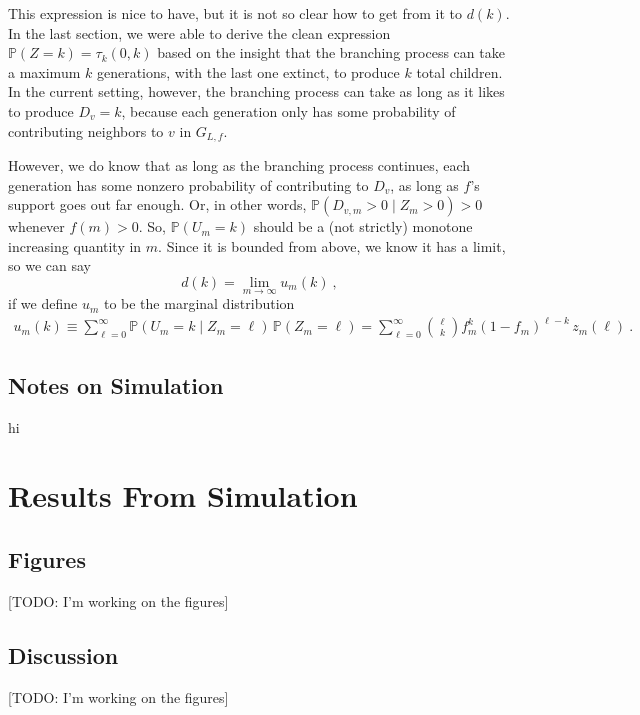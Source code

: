 \documentclass[12pt]{article}
\renewcommand{\P}{\mathbb{P}}
\begin{document}
This expression is nice to have, but it is not so clear how to get from it to $d(k)$.
In the last section, we were able to derive the clean expression $\P(Z=k)=\tau_k(0,k)$
based on the insight that the branching process can take a maximum $k$ generations, with the
last one extinct, to produce $k$ total children. In the current setting, however, the branching
process can take as long as it likes to produce $D_{v}=k$, because each generation only
has some probability of contributing neighbors to $v$ in $G_{L,f}$.\par

However, we do know that as long as the branching process continues, each generation has some
nonzero probability of contributing to $D_{v}$, as long as $f$'s support goes out far enough.
Or, in other words, $\P(D_{v,m} > 0 \mid Z_m > 0) > 0$ whenever $f(m) > 0$. So, $\P(U_m=k)$
should be a (not strictly) monotone increasing quantity in $m$. Since it is bounded from above,
we know it has a limit, so we can say \[ d(k) = \lim_{m\to\infty} u_m(k)\ ,\] if we define
$u_m$ to be the marginal distribution
\begin{align*}
u_m(k)\equiv\sum_{\ell=0}^\infty \P(U_m=k \mid Z_m=\ell)\,\P(Z_m = \ell)
= \sum_{\ell=0}^\infty \binom{\ell}{k} f_m^k (1 - f_m)^{\ell-k}\, z_m(\ell)\ .
\end{align*}


\subsection{\textbf{\textsf{Notes on Simulation}}}

hi



\section{\textbf{\textsf{Results From Simulation}}}

\subsection{\textbf{\textsf{Figures}}}
[TODO: I'm working on the figures]

\subsection{\textbf{\textsf{Discussion}}}
[TODO: I'm working on the figures]



\newpage


\end{document}
